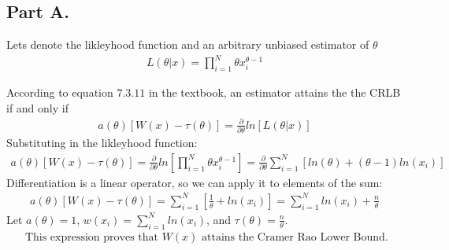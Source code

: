 \documentclass{article}
\begin{document}
\subsection*{Part A.}
Lets denote the likleyhood function and an arbitrary unbiased estimator of $\theta$
\begin{align*}
L(\theta|x) = \prod_{i=1}^{N} \theta x_i^{\theta-1}
\end{align*}

According to equation $7.3.11$ in the textbook, an estimator attains the the CRLB if and only if
\begin{align*}
a(\theta)[W(x) - \tau(\theta)] = \frac{\partial}{\partial \theta} ln[L(\theta|x)]
\end{align*}
Substituting in the likleyhood function:
\begin{align*}
a(\theta)[W(x) - \tau(\theta)] = \frac{\partial}{\partial \theta} ln[\prod_{i=1}^{N} \theta x_i^{\theta-1}] = \frac{\partial}{\partial \theta} \sum_{i=1}^{N} [ln(\theta) + (\theta-1) ln(x_i)]
\end{align*}
Differentiation is a linear operator, so we can apply it to elements of the sum:
\begin{align*}
a(\theta)[W(x) - \tau(\theta)] = \sum_{i=1}^{N} [\frac{1}{\theta} + ln(x_i)] = \sum_{i=1}^{N} ln(x_i) + \frac{n}{\theta}
\end{align*}
Let $a(\theta) = 1$, $w(x_i)=\sum_{i=1}^{N}ln(x_i)$, and $\tau(\theta) = \frac{n}{\theta}$. 
\begin{align*}
\boxed{ \text{ This expression proves that }W(x)\text{ attains the Cramer Rao Lower Bound.} }
\end{align*}
\end{document}
